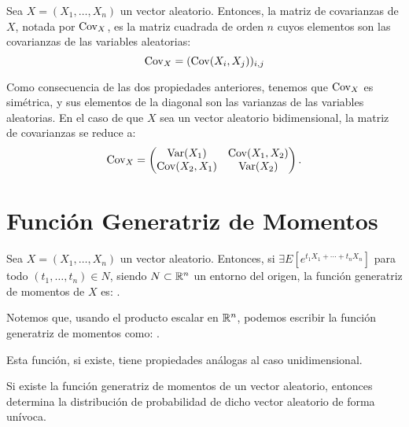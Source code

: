 \begin{definicion}
    Sea $X=(X_1,\dots,X_n)$ un vector aleatorio. Entonces, la matriz de covarianzas de $X$, notada por $\operatorname{Cov}_X$, es la matriz cuadrada de orden $n$ cuyos elementos son las covarianzas de las variables aleatorias:
    \begin{equation*}
        \operatorname{Cov}_X = (\operatorname{Cov}(X_i,X_j))_{i,j}
    \end{equation*}
\end{definicion}
Como consecuencia de las dos propiedades anteriores, tenemos que $\operatorname{Cov}_X$ es simétrica, y sus elementos de la diagonal son las varianzas de las variables aleatorias. En el caso de que $X$ sea un vector aleatorio bidimensional, la matriz de covarianzas se reduce a:
\begin{equation*}
    \operatorname{Cov}_X = \begin{pmatrix}
        \operatorname{Var}(X_1) & \operatorname{Cov}(X_1,X_2)\\
        \operatorname{Cov}(X_2,X_1) & \operatorname{Var}(X_2)
    \end{pmatrix}.
\end{equation*}

\section{Función Generatriz de Momentos}

\begin{definicion}
    Sea $X=(X_1,\dots,X_n)$ un vector aleatorio. Entonces, si $\exists E[e^{t_1X_1+\cdots+t_nX_n}]$ para todo $(t_1,\dots,t_n)\in N$, siendo $N\subset \mathbb{R}^n$ un entorno del origen, la función generatriz de momentos de $X$ es:
    .

    Notemos que, usando el producto escalar en $\mathbb{R}^n$, podemos escribir la función generatriz de momentos como:
    .
\end{definicion}

Esta función, si existe, tiene propiedades análogas al caso unidimensional.
\begin{teo}[Unicidad]
    Si existe la función generatriz de momentos de un vector aleatorio, entonces determina la distribución de probabilidad de dicho vector aleatorio de forma unívoca.
\end{teo}

